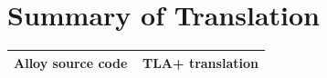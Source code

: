 \section{Summary of Translation}



\begin{center}
  \begin{tabular}{| p{0.5\linewidth} | p{0.5\linewidth} |}
  \hline
  Alloy source code & TLA+ translation \\
  \hline

    
  \end{tabular}
\end{center}



